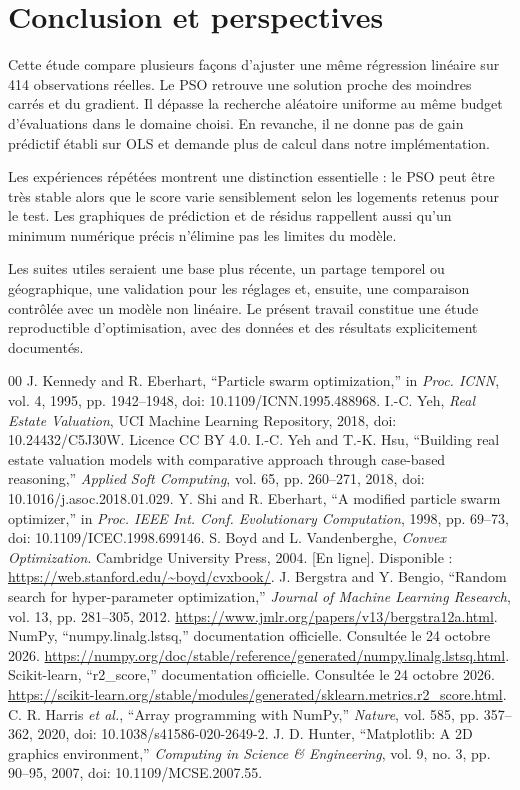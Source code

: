 \documentclass[conference,a4paper]{IEEEtran}
\begin{document}
\section{Conclusion et perspectives}
Cette étude compare plusieurs façons d'ajuster une même régression linéaire sur 414 observations réelles. Le PSO retrouve une solution proche des moindres carrés et du gradient. Il dépasse la recherche aléatoire uniforme au même budget d'évaluations dans le domaine choisi. En revanche, il ne donne pas de gain prédictif établi sur OLS et demande plus de calcul dans notre implémentation.

Les expériences répétées montrent une distinction essentielle : le PSO peut être très stable alors que le score varie sensiblement selon les logements retenus pour le test. Les graphiques de prédiction et de résidus rappellent aussi qu'un minimum numérique précis n'élimine pas les limites du modèle.

Les suites utiles seraient une base plus récente, un partage temporel ou géographique, une validation pour les réglages et, ensuite, une comparaison contrôlée avec un modèle non linéaire. Le présent travail constitue une étude reproductible d'optimisation, avec des données et des résultats explicitement documentés.

\begin{thebibliography}{00}
 J. Kennedy and R. Eberhart, ``Particle swarm optimization,'' in \textit{Proc. ICNN}, vol. 4, 1995, pp. 1942--1948, doi: 10.1109/ICNN.1995.488968.
 I.-C. Yeh, \textit{Real Estate Valuation}, UCI Machine Learning Repository, 2018, doi: 10.24432/C5J30W. Licence CC BY 4.0.
 I.-C. Yeh and T.-K. Hsu, ``Building real estate valuation models with comparative approach through case-based reasoning,'' \textit{Applied Soft Computing}, vol. 65, pp. 260--271, 2018, doi: 10.1016/j.asoc.2018.01.029.
 Y. Shi and R. Eberhart, ``A modified particle swarm optimizer,'' in \textit{Proc. IEEE Int. Conf. Evolutionary Computation}, 1998, pp. 69--73, doi: 10.1109/ICEC.1998.699146.
 S. Boyd and L. Vandenberghe, \textit{Convex Optimization}. Cambridge University Press, 2004. [En ligne]. Disponible : \url{https://web.stanford.edu/~boyd/cvxbook/}.
 J. Bergstra and Y. Bengio, ``Random search for hyper-parameter optimization,'' \textit{Journal of Machine Learning Research}, vol. 13, pp. 281--305, 2012. \url{https://www.jmlr.org/papers/v13/bergstra12a.html}.
 NumPy, ``numpy.linalg.lstsq,'' documentation officielle. Consultée le 24 octobre 2026. \url{https://numpy.org/doc/stable/reference/generated/numpy.linalg.lstsq.html}.
 Scikit-learn, ``r2\_score,'' documentation officielle. Consultée le 24 octobre 2026. \url{https://scikit-learn.org/stable/modules/generated/sklearn.metrics.r2_score.html}.
 C. R. Harris \textit{et al.}, ``Array programming with NumPy,'' \textit{Nature}, vol. 585, pp. 357--362, 2020, doi: 10.1038/s41586-020-2649-2.
 J. D. Hunter, ``Matplotlib: A 2D graphics environment,'' \textit{Computing in Science \& Engineering}, vol. 9, no. 3, pp. 90--95, 2007, doi: 10.1109/MCSE.2007.55.
\end{thebibliography}
\end{document}
